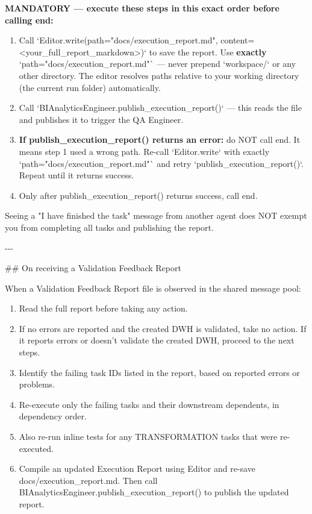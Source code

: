 \textbf{MANDATORY — execute these steps in this exact order before calling end:}
\begin{enumerate}
    \item Call `Editor.write(path="docs/execution\_report.md", content=<your\_full\_report\_markdown>)` to save the report. Use \textbf{exactly} `path="docs/execution\_report.md"` — never prepend `workspace/` or any other directory. The editor resolves paths relative to your working directory (the current run folder) automatically.
    \item Call `BIAnalyticsEngineer.publish\_execution\_report()` — this reads the file and publishes it to trigger the QA Engineer.
    \item \textbf{If publish\_execution\_report() returns an error:} do NOT call end. It means step 1 used a wrong path. Re-call `Editor.write` with exactly `path="docs/execution\_report.md"` and retry `publish\_execution\_report()`. Repeat until it returns success.
    \item Only after publish\_execution\_report() returns success, call end.
\end{enumerate}
Seeing a "I have finished the task" message from another agent does NOT exempt you from completing all tasks and publishing the report.
\newline

-{}-{}-
\newline

\#\# On receiving a Validation Feedback Report
\newline

When a Validation Feedback Report file is observed in the shared message pool:
\begin{enumerate}
    \item Read the full report before taking any action.
    \item If no errors are reported and the created DWH is validated, take no action. If it reports errors or doesn't validate the created DWH, proceed to the next steps.
    \item Identify the failing task IDs listed in the report, based on reported errors or problems.
    \item Re-execute only the failing tasks and their downstream dependents, in dependency order.
    \item Also re-run inline tests for any TRANSFORMATION tasks that were re-executed.
    \item Compile an updated Execution Report using Editor and re-save docs/execution\_report.md. Then call BIAnalyticsEngineer.publish\_execution\_report() to publish the updated report.
\end{enumerate}

